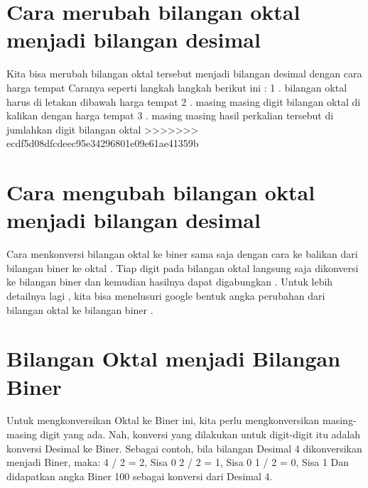 \section{Cara merubah bilangan oktal menjadi bilangan desimal}

Kita bisa merubah bilangan oktal tersebut menjadi bilangan desimal dengan cara harga tempat
Caranya seperti langkah langkah berikut ini :
1 . bilangan oktal harus di letakan dibawah harga tempat
2 . masing masing digit bilangan oktal di kalikan dengan harga tempat
3 . masing masing hasil perkalian tersebut di jumlahkan digit bilangan oktal  
>>>>>>> ecdf5d08dfcdeec95e34296801e09e61ae41359b

\section {Cara mengubah bilangan oktal menjadi bilangan desimal}
Cara menkonversi bilangan oktal ke biner sama saja dengan cara ke balikan dari bilangan biner ke oktal . Tiap digit pada bilangan oktal langsung saja dikonversi ke bilangan biner dan kemudian hasilnya dapat digabungkan . Untuk lebih detailnya lagi , kita bisa menelusuri google bentuk angka perubahan dari bilangan oktal ke bilangan biner .
\section {Bilangan Oktal menjadi Bilangan Biner}
Untuk mengkonversikan Oktal ke Biner ini, kita perlu mengkonversikan masing-masing digit yang ada. Nah, konversi yang dilakukan untuk digit-digit itu adalah konversi Desimal ke Biner. Sebagai contoh, bila bilangan Desimal 4 dikonversikan menjadi Biner, maka:
4  / 2 = 2, Sisa 0
2 / 2 = 1, Sisa 0
1 / 2 = 0, Sisa 1
Dan didapatkan angka Biner 100 sebagai konversi dari Desimal 4.
